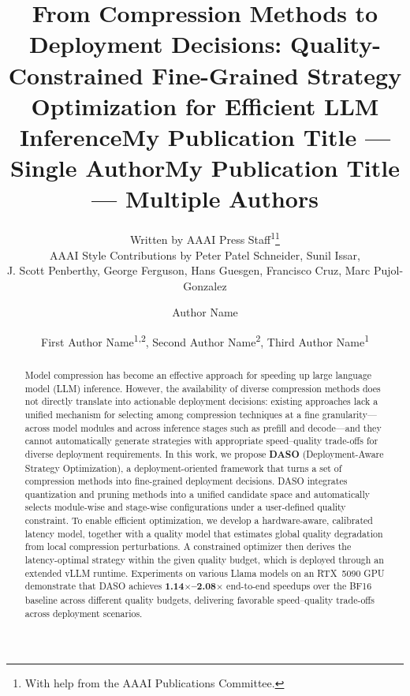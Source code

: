 \documentclass[letterpaper]{article} %
\title{From Compression Methods to Deployment Decisions: Quality-Constrained Fine-Grained Strategy Optimization for Efficient LLM Inference}
\author{
    Written by AAAI Press Staff\textsuperscript{\rm 1}\thanks{With help from the AAAI Publications Committee.}\\
    AAAI Style Contributions by Peter Patel Schneider,
    Sunil Issar,\\
    J. Scott Penberthy,
    George Ferguson,
    Hans Guesgen,
    Francisco Cruz\equalcontrib\corresponding,
    Marc Pujol-Gonzalez\equalcontrib\corresponding
}
\title{My Publication Title --- Single Author}
\author {
    Author Name
}
\title{My Publication Title --- Multiple Authors}
\author {
    First Author Name\textsuperscript{\rm 1,\rm 2}\equalcontrib,
    Second Author Name\textsuperscript{\rm 2}\equalcontrib,
    Third Author Name\textsuperscript{\rm 1}\corresponding
}
\begin{document}
\maketitle

\begin{abstract}
Model compression has become an effective approach for speeding up large language model (LLM) inference. However, the availability of diverse compression methods does not directly translate into actionable deployment decisions: existing approaches lack a unified mechanism for selecting among compression techniques at a fine granularity---across model modules and across inference stages such as prefill and decode---and they cannot automatically generate strategies with appropriate speed--quality trade-offs for diverse deployment requirements. In this work, we propose \textbf{DASO} (Deployment-Aware Strategy Optimization), a deployment-oriented framework that turns a set of compression methods into fine-grained deployment decisions. DASO integrates quantization and pruning methods into a unified candidate space and automatically selects module-wise and stage-wise configurations under a user-defined quality constraint. To enable efficient optimization, we develop a hardware-aware, calibrated latency model, together with a quality model that estimates global quality degradation from local compression perturbations. A constrained optimizer then derives the latency-optimal strategy within the given quality budget, which is deployed through an extended vLLM runtime. Experiments on various Llama models on an RTX~5090 GPU demonstrate that DASO achieves \textbf{1.14$\times$--2.08$\times$} end-to-end speedups over the BF16 baseline across different quality budgets, delivering favorable speed--quality trade-offs across deployment scenarios.

\end{abstract}
\end{document}
